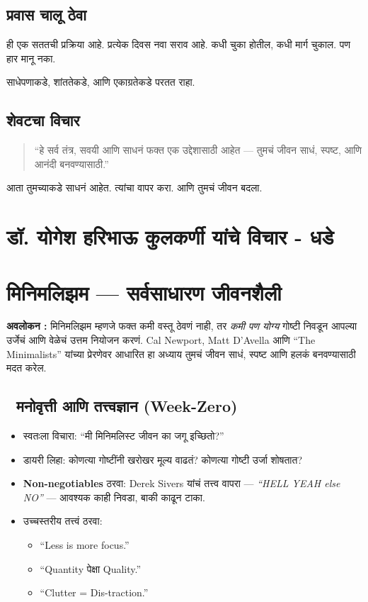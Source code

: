 \section*{प्रवास चालू ठेवा}
ही एक सततची प्रक्रिया आहे.  
प्रत्येक दिवस नवा सराव आहे.  
कधी चुका होतील, कधी मार्ग चुकाल.  
पण हार मानू नका.  

साधेपणाकडे, शांततेकडे,  
आणि एकाग्रतेकडे परतत राहा.  

\section*{शेवटचा विचार}
\begin{quote}
“हे सर्व तंत्र, सवयी आणि साधनं  
फक्त एक उद्देशासाठी आहेत —  
तुमचं जीवन साधं, स्पष्ट, आणि आनंदी बनवण्यासाठी.”  
\end{quote}

आता तुमच्याकडे साधनं आहेत.  
त्यांचा वापर करा.  
आणि तुमचं जीवन बदला.  


\chapter*{डॉ. योगेश हरिभाऊ कुलकर्णी  यांचे विचार - धडे }

\chapter{मिनिमलिझम — सर्वसाधारण जीवनशैली}

\textbf{अवलोकन :}  
मिनिमलिझम म्हणजे फक्त कमी वस्तू ठेवणं नाही, तर \textit{कमी पण योग्य} गोष्टी निवडून आपल्या उर्जेचं आणि वेळेचं उत्तम नियोजन करणं. Cal Newport, Matt D’Avella आणि “The Minimalists” यांच्या प्रेरणेवर आधारित हा अध्याय तुमचं जीवन साधं, स्पष्ट आणि हलकं बनवण्यासाठी मदत करेल.  

\section*{🌱 मनोवृत्ती आणि तत्त्वज्ञान (Week-Zero)}

\begin{itemize}
  \item स्वतःला विचारा: “मी मिनिमलिस्ट जीवन का जगू इच्छितो?”  
  \item डायरी लिहा: कोणत्या गोष्टींनी खरोखर मूल्य वाढतं? कोणत्या गोष्टी उर्जा शोषतात?  
  \item \textbf{Non-negotiables} ठरवा: Derek Sivers यांचं तत्त्व वापरा — \textit{“HELL YEAH else NO”} — आवश्यक काही निवडा, बाकी काढून टाका.  
  \item उच्चस्तरीय तत्त्वं ठरवा:  
  \begin{itemize}
    \item “Less is more focus.”  
    \item “Quantity पेक्षा Quality.”  
    \item “Clutter = Dis-traction.”  
  \end{itemize}
\end{itemize}

